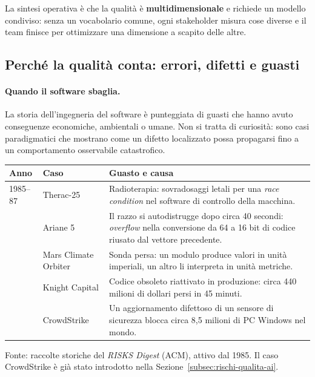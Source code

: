 \documentclass[12pt]{extarticle}
\begin{document}
\noindent La sintesi operativa è che la qualità è \textbf{multidimensionale} e richiede un modello condiviso: senza un vocabolario comune, ogni stakeholder misura cose diverse e il team finisce per ottimizzare una dimensione a scapito delle altre.

\subsection{Perché la qualità conta: errori, difetti e guasti}

\paragraph{Quando il software sbaglia.}
La storia dell'ingegneria del software è punteggiata di guasti che hanno avuto conseguenze economiche, ambientali o umane. Non si tratta di curiosità: sono casi paradigmatici che mostrano come un difetto localizzato possa propagarsi fino a un comportamento osservabile catastrofico.

\begin{center}
\small
\begin{tabular}{p{2.0cm}p{3.0cm}p{10.6cm}}
    \toprule
    \textbf{Anno} & \textbf{Caso} & \textbf{Guasto e causa} \\
    \midrule
    1985--87 & Therac-25 & Radioterapia: sovradosaggi letali per una \textit{race condition} nel software di controllo della macchina. \\
    \addlinespace
    1996 & Ariane 5 & Il razzo si autodistrugge dopo circa 40 secondi: \textit{overflow} nella conversione da 64 a 16 bit di codice riusato dal vettore precedente. \\
    \addlinespace
    1999 & Mars Climate Orbiter & Sonda persa: un modulo produce valori in unità imperiali, un altro li interpreta in unità metriche. \\
    \addlinespace
    2012 & Knight Capital & Codice obsoleto riattivato in produzione: circa 440 milioni di dollari persi in 45 minuti. \\
    \addlinespace
    2024 & CrowdStrike & Un aggiornamento difettoso di un sensore di sicurezza blocca circa 8,5 milioni di PC Windows nel mondo. \\
    \bottomrule
\end{tabular}
\end{center}

\noindent\footnotesize Fonte: raccolte storiche del \textit{RISKS Digest} (ACM), attivo dal 1985. Il caso CrowdStrike è già stato introdotto nella Sezione~\ref{subsec:rischi-qualita-ai}.
\end{document}
